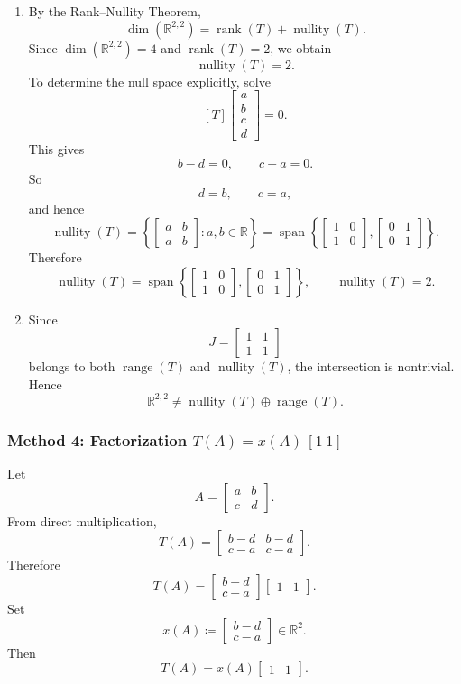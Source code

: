 \documentclass[12pt]{article}
\newcommand{\R}{\mathbb{R}}
\DeclareMathOperator{\Range}{range}
\DeclareMathOperator{\Rank}{rank}
\DeclareMathOperator{\Nullity}{nullity}
\DeclareMathOperator{\Null}{nullity}
\begin{document}
\begin{enumerate}[label=(\alph*)]
\item By the Rank--Nullity Theorem,
\[
\dim(\R^{2,2})=\Rank(T)+\Nullity(T).
\]
Since \(\dim(\R^{2,2})=4\) and \(\Rank(T)=2\), we obtain
\[
\Nullity(T)=2.
\]
To determine the null space explicitly, solve
\[
[T]\begin{bmatrix}a\\b\\c\\d\end{bmatrix}=0.
\]
This gives
\[
b-d=0,
\qquad
c-a=0.
\]
So
\[
d=b,\qquad c=a,
\]
and hence
\[
\Null(T)=
\left\{
\begin{bmatrix}a&b\\a&b\end{bmatrix}:a,b\in\R
\right\}
=
\operatorname{span}\left\{
\begin{bmatrix}1&0\\1&0\end{bmatrix},
\begin{bmatrix}0&1\\0&1\end{bmatrix}
\right\}.
\]
Therefore
\[
\boxed{
\Null(T)=
\operatorname{span}\left\{
\begin{bmatrix}1&0\\1&0\end{bmatrix},
\begin{bmatrix}0&1\\0&1\end{bmatrix}
\right\},
\qquad
\Nullity(T)=2.}
\]

\item Since
\[
J=\begin{bmatrix}1&1\\1&1\end{bmatrix}
\]
belongs to both \(\Range(T)\) and \(\Null(T)\), the intersection is nontrivial. Hence
\[
\boxed{\R^{2,2}\neq \Null(T)\oplus \Range(T).}
\]
\end{enumerate}

\subsubsection{Method 4: Factorization \(T(A)=x(A)\,[1\ 1]\)}
Let
\[
A=\begin{bmatrix}a&b\\c&d\end{bmatrix}.
\]
From direct multiplication,
\[
T(A)=
\begin{bmatrix}
b-d&b-d\\
c-a&c-a
\end{bmatrix}.
\]
Therefore
\[
T(A)=
\begin{bmatrix}
b-d\\
c-a
\end{bmatrix}
\begin{bmatrix}1&1\end{bmatrix}.
\]
Set
\[
x(A)\coloneqq
\begin{bmatrix}
b-d\\
c-a
\end{bmatrix}\in \R^2.
\]
Then
\[
T(A)=x(A)\begin{bmatrix}1&1\end{bmatrix}.
\]
\end{document}
